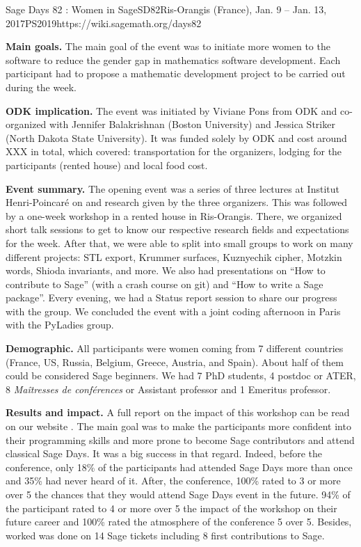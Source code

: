 \begin{event}{Sage Days 82 : Women in Sage}{SD82}{Ris-Orangis (France), Jan. 9 -- Jan. 13, 2017}{PS}{20}{19}{https://wiki.sagemath.org/days82}

\textbf{Main goals.} The main goal of the event was to initiate more women to the software \Sage to reduce the gender gap in mathematics software
development. Each participant had to propose a mathematic development project to be carried out during the week.

\textbf{ODK implication.} The event was initiated by Viviane Pons from ODK and co-organized with Jennifer Balakrishnan (Boston University) and Jessica Striker (North Dakota State University). It was funded solely by ODK and cost around XXX in total, which covered: transportation for the organizers, lodging for the participants (rented house) and local food cost. 

\textbf{Event summary.} The opening event was a series of three lectures at Institut Henri-Poincaré on \Sage and research given by the three organizers. This was followed by a one-week workshop in a rented house in Ris-Orangis. There, we organized short talk sessions to get to know our respective research fields and expectations for the week. After that, we were able to split into small groups to work on many different projects: STL export, Krummer surfaces, Kuznyechik cipher, Motzkin words, Shioda invariants, and more. We also had presentations on ``How to contribute to Sage'' (with a crash course on git) and ``How to write a Sage package''. Every evening, we had a Status report session to share our progress with the group. We concluded the event with a joint coding afternoon in Paris with the PyLadies group.

\textbf{Demographic.} All participants were women coming from 7 different countries (France, US, Russia, Belgium, Greece, Austria, and Spain). About half of them could be considered Sage beginners. We had 7 PhD students, 4 postdoc or ATER, 8 \textit{Maîtresses de conférences} or Assistant professor and 1 Emeritus professor. 

\textbf{Results and impact.} A full report on the impact of this workshop can be read on our website \cite{17PonsSD82}. The main goal was to make the participants more confident into their programming skills and more prone to become Sage contributors and attend classical Sage Days. It was a big success in that regard. Indeed, before the conference, only 18\% of the participants had attended Sage Days more than once and 35\% had never heard of it. After, the conference, 100\% rated to 3 or more over 5 the chances that they would attend Sage Days event in the future. 94\% of the participant rated to 4 or more over 5 the impact of the workshop on their future career and 100\% rated the atmosphere of the conference 5 over 5. Besides, worked was done on 14 Sage tickets including 8 first contributions to Sage.


\end{event}
